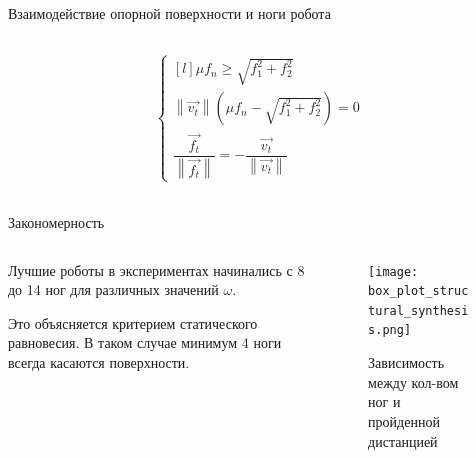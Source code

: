 \begin{frame}[t]{Взаимодействие опорной поверхности и ноги робота}
\begin{columns}[T,onlytextwidth]
\begin{column}{0.29\textwidth}
\begin{align}
                \left\{\begin{matrix*}[l]
                           \mu f_n \geqslant \sqrt{f_1^2 + f_2^2}\\
                           \left\lVert \vec{v_t}\right\rVert (\mu f_n - \sqrt{f_1^2 + f_2^2}) = 0\\
                           \dfrac{\vec{f_t}}{\left\lVert \vec{f_t}\right\rVert } = - \dfrac{\vec{v_t}}{\left\lVert \vec{v_t}\right\rVert }
                       \end{matrix*}\right.
            \end{align}
        \end{column}
    \end{columns}
\end{frame}


\begin{frame}[t]{Закономерность}
    \begin{columns}[T,onlytextwidth]
        \begin{column}{0.49\textwidth}
            Лучшие роботы в экспериментах начинались с 8 до 14 ног для различных значений $\omega$.

            Это объясняется критерием статического равновесия. В таком случае минимум 4 ноги всегда касаются поверхности.
        \end{column}
        \begin{column}{0.49\textwidth}
            \begin{figure}[H]
                \centering\texttt{[image: box\_plot\_structural\_synthesis.png]}
                \caption*{Зависимость между кол-вом ног и пройденной дистанцией}
            \end{figure}
        \end{column}
    \end{columns}
\end{frame}


